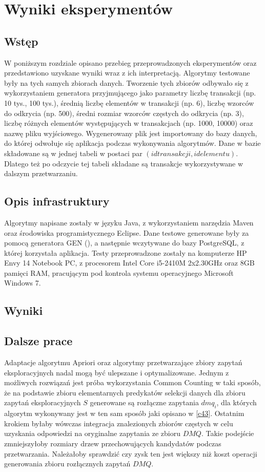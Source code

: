 \chapter{Wyniki eksperymentów}
\label{c5}

\section{Wstęp}
\label{c51}
W poniższym rozdziale opisano przebieg przeprowadzonych eksperymentów oraz przedstawiono uzyskane wyniki wraz z ich interpretacją. Algorytmy testowane były na tych samych zbiorach danych. Tworzenie tych zbiorów odbywało się z wykorzystaniem generatora przyjmującego jako parametry liczbę transakcji (np. 10 tys., 100 tys.), średnią liczbę elementów w transakcji (np. 6), liczbę wzorców do odkrycia (np. 500), średni rozmiar wzorców częstych do odkrycia (np. 3), liczbę różnych elementów występujących w transakcjach (np. 1000, 10000) oraz nazwę pliku wyjściowego. Wygenerowany plik jest importowany do bazy danych, do której odwołuje się aplikacja podczas wykonywania algorytmów. Dane w bazie składowane są w jednej tabeli w postaci par \((id transakcji, id elementu)\). Dlatego też po odczycie tej tabeli składane są transakcje wykorzystywane w dalszym przetwarzaniu. 

\section{Opis infrastruktury}
\label{c52}
Algorytmy napisane zostały w języku Java, z wykorzystaniem narzędzia Maven oraz środowiska programistycznego Eclipse. Dane testowe generowane były za pomocą generatora GEN (\cite{AgrawalGEN}), a następnie wczytywane do bazy PostgreSQL, z której korzystała aplikacja. Testy przeprowadzone zostały na komputerze HP Envy 14 Notebook PC, z procesorem Intel Core i5-2410M 2x2.30GHz oraz 8GB pamięci RAM, pracującym pod kontrola systemu operacyjnego Microsoft Windows 7. 

\section{Wyniki}
\label{c53}

\section{Dalsze prace}
\label{c54}
Adaptacje algorytmu Apriori oraz algorytmy przetwarzające zbiory zapytań eksploracyjnych nadal mogą być ulepszane i optymalizowane. Jednym z możliwych rozwiązań jest próba wykorzystania Common Counting w taki sposób, że na podstawie zbioru elementarnych predykatów selekcji danych dla zbioru zapytań eksploracyjnych \(S\) generowane są rozłączne zapytania \(dmq_i\), dla których algorytm wykonywany jest w ten sam sposób jaki opisano w \ref{c43}. Ostatnim krokiem byłaby wówczas integracja znalezionych zbiorów częstych w celu uzyskania odpowiedzi na oryginalne zapytania ze zbioru \(DMQ\). Takie podejście zmniejszyłoby rozmiary drzew przechowujących kandydatów podczas przetwarzania. Należałoby sprawdzić czy zysk ten jest większy niż koszt operacji generowania zbioru rozłącznych zapytań \(DMQ\). 
